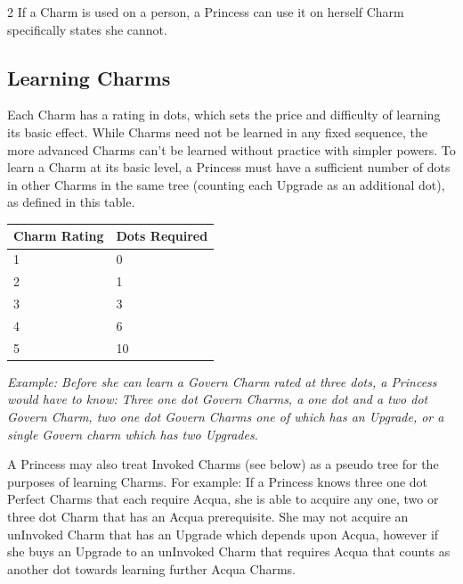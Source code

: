 \begin{multicols}{2}
If a Charm is used on a person, a Princess can use it on herself Charm specifically states she cannot. 


\subsection*{Learning Charms}

Each Charm has a rating in dots, which sets the price and difficulty of learning its basic effect. While Charms need not be learned in any fixed sequence, the more advanced Charms can't be learned without practice with simpler powers. To learn a Charm at its basic level, a Princess must have a sufficient number of dots in other Charms in the same tree (counting each Upgrade as an additional dot), as defined in this table. 

\begin{mybox}

    \begin{tabular}{|l|l|}
        \hline
        Charm Rating & Dots Required \\ \hline
        1            & 0             \\ \hline
        2            & 1             \\ \hline
        3            & 3             \\ \hline
        4            & 6             \\ \hline
        5            & 10            \\
        \hline
    \end{tabular}

\end{mybox}
    
\textit{Example: Before she can learn a Govern Charm rated at three dots, a Princess would have to know: Three one dot Govern Charms, a one dot and a two dot Govern Charm, two one dot Govern Charms one of which has an Upgrade, or a single Govern charm which has two Upgrades.}

A Princess may also treat Invoked Charms (see below) as a pseudo tree for the purposes of learning Charms. For example: If a Princess knows three one dot Perfect Charms that each require Acqua, she is able to acquire any one, two or three dot Charm that has an Acqua prerequisite. She may not acquire an unInvoked Charm that has an Upgrade which depends upon Acqua, however if she buys an Upgrade to an unInvoked Charm that requires Acqua that counts as another dot towards learning further Acqua Charms. 


\end{multicols}
